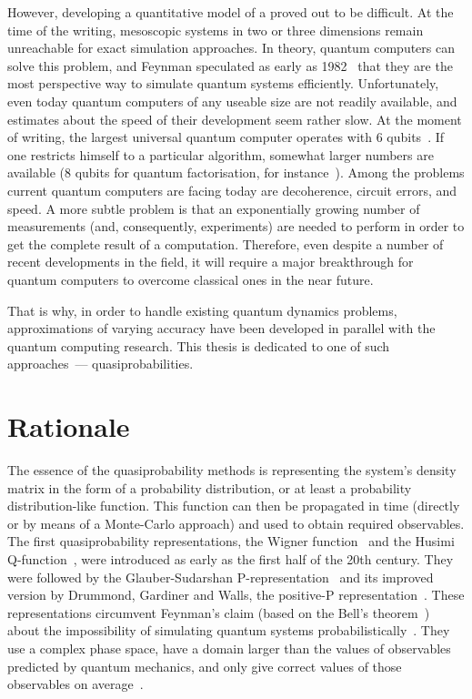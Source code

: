 However, developing a quantitative model of a  proved out to be difficult.
At the time of the writing, mesoscopic systems in two or three dimensions remain unreachable for exact simulation approaches.
In theory, quantum computers can solve this problem, and Feynman speculated as early as 1982~\cite{Feynman1982} that they are the most perspective way to simulate quantum systems efficiently.
Unfortunately, even today quantum computers of any useable size are not readily available, and estimates about the speed of their development seem rather slow.
At the moment of writing, the largest universal quantum computer operates with 6 qubits~\cite{Lanyon2011}.
If one restricts himself to a particular algorithm, somewhat larger numbers are available (8 qubits for quantum factorisation, for instance~\cite{Xu2012}).
Among the problems current quantum computers are facing today are decoherence, circuit errors, and speed.
A more subtle problem is that an exponentially growing number of measurements (and, consequently, experiments) are needed to perform in order to get the complete result of a computation.
Therefore, even despite a number of recent developments in the field, it will require a major breakthrough for quantum computers to overcome classical ones in the near future.

That is why, in order to handle existing quantum dynamics problems, approximations of varying accuracy have been developed in parallel with the quantum computing research.
This thesis is dedicated to one of such approaches~--- quasiprobabilities.


\section{Rationale}

The essence of the quasiprobability methods is representing the system's density matrix in the form of a probability distribution, or at least a probability distribution-like function.
This function can then be propagated in time (directly or by means of a Monte-Carlo approach) and used to obtain required observables.
The first quasiprobability representations, the Wigner function~\cite{Wigner1932,Dirac1945,Moyal1947} and the Husimi Q-function~\cite{Husimi1940}, were introduced as early as the first half of the 20th century.
They were followed by the Glauber-Sudarshan P-representation~\cite{Sudarshan1963,Glauber1963b,Glauber1963} and its improved version by Drummond, Gardiner and Walls, the positive-P representation~\cite{Drummond1980,Drummond1981}.
These representations circumvent Feynman's claim (based on the Bell's theorem~\cite{Bell1964}) about the impossibility of simulating quantum systems probabilistically~\cite{Feynman1982}.
They use a complex phase space, have a domain larger than the values of observables predicted by quantum mechanics, and only give correct values of those observables on average~\cite{Opanchuk2013-bell-sim,Drummond2013-bell-sim}.

